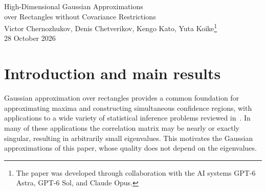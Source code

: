 \documentclass[11pt,letterpaper]{article}
\theoremstyle{remark}
\newcommand{\E}{\mathbb E}
\newcommand{\Pp}{\mathbb P}
\newcommand{\R}{\mathbb R}
\begin{document}
\begin{center}
{\Large High-Dimensional Gaussian Approximations\\[0.15em]
over Rectangles without Covariance Restrictions}\\[0.85em]
{\normalsize Victor Chernozhukov, Denis Chetverikov, Kengo Kato, Yuta
Koike\renewcommand{\thefootnote}{\fnsymbol{footnote}}\footnote{The paper
was developed through collaboration with the AI systems GPT-6 Astra,
GPT-6 Sol, and Claude Opus.}}\\[0.65em]
{\normalsize 28 October 2026}
\end{center}
\setcounter{footnote}{0}
\thispagestyle{plain}

\begin{abstract}
 This paper studies the Gaussian approximation of sums of independent bounded random
vectors over rectangles, with no assumption on the correlation matrix,
which may be singular. Let \(X_1,\ldots,X_n\) be independent centered
random vectors in \(\R^p\) whose coordinates \(X_{ij}\) are bounded in
absolute value by a constant~\(B\), and suppose that each coordinate of
\(W_n\coloneqq n^{-1/2}(X_1+\cdots+X_n)\) has unit variance. Let \(Z_n\) be a
centered Gaussian vector with the covariance matrix of \(W_n\), and put
\(L\coloneqq \log(ep)\) and \(\log_+x\coloneqq \max\{0,\log x\}\). The largest difference
between \(\Pp(W_n\in A)\) and \(\Pp(Z_n\in A)\) over rectangles \(A\) is
at most
\[
 \frac{BL^{3/2}}{\sqrt n}\sqrt{1+\log_+\sqrt{n/L}},
\]
up to a numerical constant. If, for a fixed \(c_0>0\), no two
coordinates have correlation larger than \(1-c_0\) in absolute value, the
bound improves slightly. When \(p\) grows
polynomially in~\(n\), the two bounds are of order \(n^{-1/2}(\log n)^2\) and
\(n^{-1/2}(\log n)^{3/2}\), respectively. A further refinement holds if the
third moments cancel in aggregate, that is, if
\(\sum_i\E[X_{ij}X_{ik}X_{i\ell}]=0\) for all coordinates \(j,k,\ell\).
The factor \(BL^{3/2}/\sqrt n\) cannot be improved in general, so the
second rate is then optimal and the first is optimal up to the factor
\((\log n)^{1/2}\).

\end{abstract}

\clearpage
\tableofcontents
\clearpage

\section{\texorpdfstring{Introduction and main results}{Introduction and main results}}\label{sec:results}
Gaussian approximation over rectangles provides a common foundation for
approximating maxima and constructing simultaneous confidence regions, with
applications to a wide variety of statistical inference problems reviewed in~\cite{CCKK2023}.
In many of these applications the correlation matrix may be nearly or
exactly singular, resulting in arbitrarily small eigenvalues. This motivates the
Gaussian approximations of this paper, whose quality does not depend on the
eigenvalues.
\end{document}
